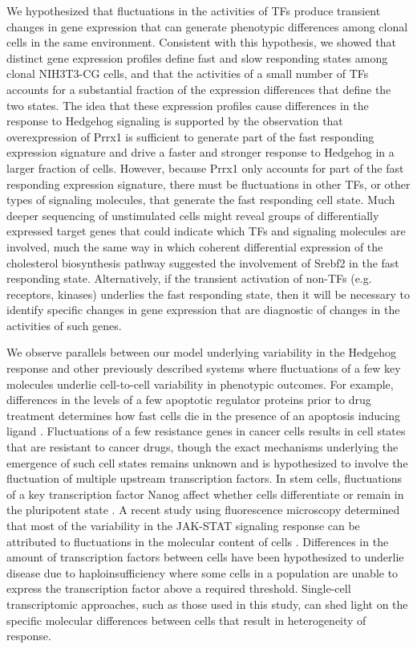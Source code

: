 We hypothesized that fluctuations in the activities of TFs produce transient changes in gene expression that can generate phenotypic differences among clonal cells in the same environment. Consistent with this hypothesis, we showed that distinct gene expression profiles define fast and slow responding states among clonal NIH3T3-CG cells, and that the activities of a small number of TFs accounts for a substantial fraction of the expression differences that define the two states. The idea that these expression profiles cause differences in the response to Hedgehog signaling is supported by the observation that overexpression of Prrx1 is sufficient to generate part of the fast responding expression signature and drive a faster and stronger response to Hedgehog in a larger fraction of cells. However, because Prrx1 only accounts for part of the fast responding expression signature, there must be fluctuations in other TFs\cite{Sigal2006-ds}, or other types of signaling molecules, that generate the fast responding cell state. Much deeper sequencing of unstimulated cells might reveal groups of differentially expressed target genes that could indicate which TFs and signaling molecules are involved, much the same way in which coherent differential expression of the cholesterol biosynthesis pathway suggested the involvement of Srebf2 in the fast responding state. Alternatively, if the transient activation of non-TFs (e.g. receptors, kinases)\cite{Colman-Lerner2005-ln} underlies the fast responding state, then it will be necessary to identify specific changes in gene expression that are diagnostic of changes in the activities of such genes.

We observe parallels between our model underlying variability in the Hedgehog response and other previously described systems where fluctuations of a few key molecules underlie cell-to-cell variability in phenotypic outcomes. For example, differences in the levels of a few apoptotic regulator proteins prior to drug treatment determines how fast cells die in the presence of an apoptosis inducing ligand \cite{Spencer2009-hh}.  Fluctuations of a few resistance genes in cancer cells results in cell states that are resistant to cancer drugs, \cite{Emert2021-ej,Shaffer2020-ff} though the exact mechanisms underlying the emergence of such cell states remains unknown and is hypothesized to involve the fluctuation of multiple upstream transcription factors. In stem cells, fluctuations of a key transcription factor Nanog affect whether cells differentiate or remain in the pluripotent state \cite{Miyanari2012-zv,Torres-Padilla2014-mz}. A recent study using fluorescence microscopy determined that most of the variability in the JAK-STAT signaling response can be attributed to fluctuations in the molecular content of cells \cite{Topolewski2022-bw}. Differences in the amount of transcription factors between cells have been hypothesized to underlie disease due to haploinsufficiency where some cells in a population are unable to express the transcription factor above a required threshold.\cite{Cook1998-es,Kemkemer2002-iw} Single-cell transcriptomic approaches, such as those used in this study, can shed light on the specific molecular differences between cells that result in heterogeneity of response.

